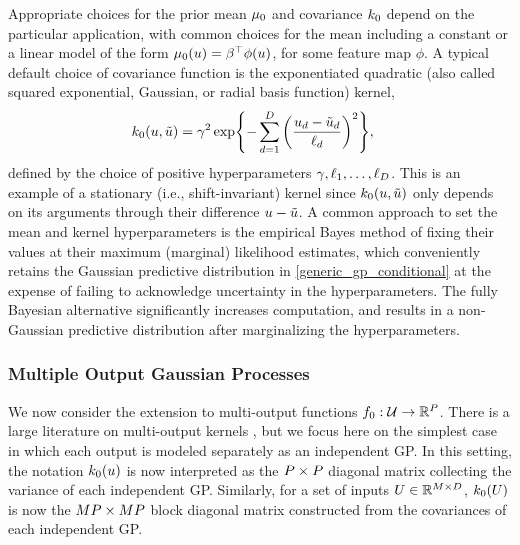 \documentclass[12pt]{article}
\begin{document}
Appropriate choices for the prior mean $\mu_0$ and covariance $k_0$ depend on the 
particular application, with common choices for the mean including a constant or a linear model of the form 
$\mu_0(u) = \beta^\top \phi(u)$, for some feature map $\phi$. A typical default choice of 
covariance function is the exponentiated quadratic (also called squared exponential, Gaussian, or radial basis function)
kernel,
\begin{align}
k_0(u, \tilde{u}) &= 
\gamma^2 \exp\mathopen{}\left\{- \sum_{d=1}^{D} \left(\frac{u_{d} - \tilde{u}_{d}}{\ell_{d}} \right)^2\right\}\mathclose{}, \label{Gaussian_kernel}
\end{align}
defined by the choice of positive hyperparameters $\gamma, \ell_{1}, \dots, \ell_{D}$. 
This is an example of a stationary (i.e., shift-invariant) kernel since $k_0(u, \tilde{u})$ only depends 
on its arguments through their difference $u - \tilde{u}$. 
A common approach to set the mean and kernel hyperparameters is the empirical Bayes method of fixing
their values at their maximum (marginal) likelihood estimates, which conveniently retains the Gaussian
predictive distribution in \cref{generic_gp_conditional} at the expense of failing to acknowledge uncertainty
in the hyperparameters. The fully Bayesian alternative significantly increases computation, 
and results in a non-Gaussian predictive distribution after marginalizing the hyperparameters. 

\subsubsection{Multiple Output Gaussian Processes}
We now consider the extension to multi-output functions $f_{0}: \mathcal{U} \to \mathbb{R}^{P}$. 
There is a large literature on multi-output kernels \citep{multiOutputKernels}, but we focus here on the 
simplest case in which each output is modeled separately as an independent GP. 
In this setting, the notation $k_0(u)$ is now interpreted as the $P \times P$ 
diagonal matrix collecting the variance of each independent GP. Similarly, for a set of inputs 
$U \in \mathbb{R}^{M \times D}$, $k_0(U)$ is now the 
$MP \times MP$ block diagonal matrix constructed from the covariances of 
each independent GP.
 
\end{document}
